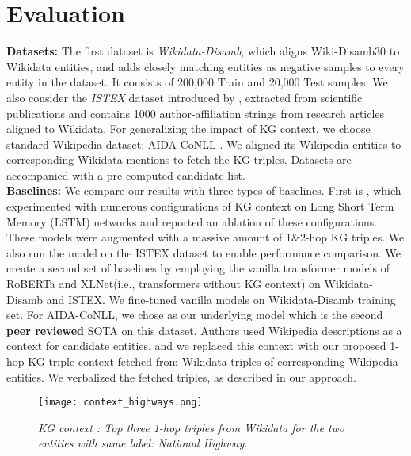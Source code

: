 \documentclass[sigconf, superscriptaddress]{acmart}
\begin{document}
\section{Evaluation}
\label{sec:evaluation}
\textbf{Datasets:} The first dataset is \textit{Wikidata-Disamb}\cite{cetoli2019neural}, which aligns Wiki-Disamb30 \cite{TagMe-DBLP:journals/corr/abs-1006-3498} to Wikidata entities, and adds closely matching entities as negative samples to every entity in the dataset. It consists of 200,000 Train and 20,000 Test samples. We also consider the \textit{ISTEX} dataset introduced by \cite{Opentapioca-DBLP:journals/corr/abs-1904-09131}, extracted from scientific publications and contains 1000 author-affiliation strings from research articles aligned to Wikidata. For generalizing the impact of KG context, we choose standard Wikipedia dataset: AIDA-CoNLL \cite{DBLP:conf/emnlp/HoffartYBFPSTTW11}. We  aligned its Wikipedia entities to corresponding Wikidata mentions to fetch the KG triples. Datasets are accompanied with a pre-computed candidate list.\\
\textbf{Baselines: }
We compare our results with three types of baselines. First is \cite{cetoli2019neural}, which experimented with numerous configurations of KG context on Long Short Term Memory (LSTM) networks and reported an ablation of these configurations. These models were augmented with a massive amount of 1\&2-hop KG triples. We also run the model on the ISTEX dataset to enable performance comparison. We create a second set of baselines by employing the vanilla transformer models of RoBERTa and XLNet(i.e., transformers without KG context) on Wikidata-Disamb and ISTEX. We fine-tuned vanilla models on Wikidata-Disamb training set. 
For AIDA-CoNLL, we chose \cite{DBLP:conf/emnlp/YangGLTZWCHR19} as our underlying model which is the second \textbf{peer reviewed} SOTA on this dataset. Authors used Wikipedia descriptions as a context for candidate entities, and we replaced this context with our proposed 1-hop KG triple context fetched from Wikidata triples of corresponding Wikipedia entities. We verbalized the fetched triples, as described in our approach. 
\vspace{-2mm}
\begin{figure}[!h]
\texttt{[image: context\_highways.png]}
\vspace{-2mm}
\caption{\textit{\small{KG context : Top three 1-hop triples from Wikidata for the two entities with same label: National Highway.}}}
\label{fig:context} 
\vspace{-3mm}
\end{figure}
\end{document}
